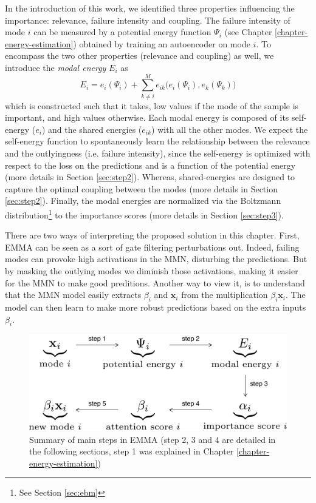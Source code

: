 In the introduction of this work, we identified three properties influencing the importance: relevance, failure intensity and coupling. The failure intensity of mode $i$ can be measured by a potential energy function $\Psi_i$ (see Chapter \ref{chapter-energy-estimation}) obtained by training an autoencoder on mode $i$. To encompass the two other properties (relevance and coupling) as well, we introduce the \textit{modal energy} $E_i$ as
\begin{equation}
E_i = e_i(\Psi_i)  + \sum_{k\neq i}^M e_{ik}\big(e_i(\Psi_i), e_k(\Psi_k)\big)
\label{eq:general-framework}
\end{equation}
which is constructed such that it takes, low values if the mode of the sample is important, and high values otherwise. Each modal energy is composed of its self-energy ($e_i$) and the shared energies ($e_{ik}$) with all the other modes. We expect the self-energy function to spontaneously learn the relationship between the relevance and the outlyingness (i.e. failure intensity), since the self-energy is optimized with respect to the loss on the predictions and is a function of the potential energy (more details in Section \ref{sec:step2}). Whereas, shared-energies are designed to capture the optimal coupling between the modes (more details in Section \ref{sec:step2}). Finally, the modal energies are normalized via the Boltzmann distribution\footnote{See Section \ref{sec:ebm}} to the importance scores (more details in Section \ref{sec:step3}).

There are two ways of interpreting the proposed solution in this chapter. First, EMMA can be seen as a sort of gate filtering perturbations out. Indeed, failing modes can provoke high activations in the MMN, disturbing the predictions. But by masking the outlying modes we diminish those activations, making it easier for the MMN to make good preditions. Another way to view it, is to understand that the MMN model easily extracts $\beta_i$ and $\mathbf{x}_i$ from the multiplication $\beta_i\mathbf{x}_i$. The model can then learn to make more robust predictions based on the extra inputs $\beta_i$.
\begin{figure}[!ht]
\centering
\includegraphics[scale=0.4]{figures/framework}
\caption[Summary of main steps in EMMA]{Summary of main steps in EMMA (step 2, 3 and 4 are detailed in the following sections, step 1 was explained in Chapter \ref{chapter-energy-estimation})}
\end{figure}

